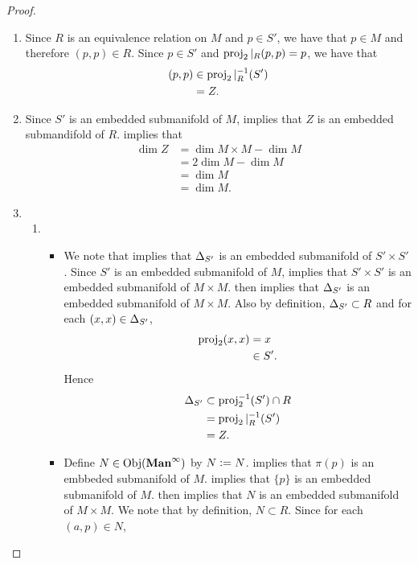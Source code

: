 \documentclass{book}
\begin{document}
	\begin{proof}\
		\begin{enumerate}
			\item Since $R$ is an equivalence relation on $M$ and $p \in S'$, we have that $p \in M$ and therefore $(p,p) \in R$. Since $p \in S'$ and $\operatorname{\text{proj}}_2|_R(p,p) = p$, we have that
			\begin{align*}
				(p,p) 
				& \in \operatorname{\text{proj}}_2|_R^{-1}(S') \\
				& = Z.
			\end{align*}
			\item {} Since $S'$ is an embedded submanifold of $M$,  implies that $Z$ is an embedded submandifold of $R$. \rex{}  implies that
			\begin{align*}
				\dim Z 
				& = \dim M \times M - \dim M \\
				& = 2 \dim M - \dim M \\
				& = \dim M \\
				& = \dim M.
			\end{align*}
			\item 
			\begin{enumerate}
				\item 
				\begin{itemize}
					\item We note that  implies that $\Delta_{S'}$ is an embedded submanifold of $S' \times S'$. Since $S'$ is an embedded submanifold of $M$,  implies that $S' \times S'$ is an embedded submanifold of $M \times M$.  then implies that $\Delta_{S'}$ is an embedded submanifold of $M \times M$. 
					Also by definition, $\Delta_{S'} \subset R$ and for each $(x, x) \in \Delta_{S'}$, 
					\begin{align*}
						\operatorname{\text{proj}}_2(x, x) 
						& = x \\
						& \in S'.
					\end{align*}
					Hence 
					\begin{align*}
						\Delta_{S'} 
						& \subset \operatorname{\text{proj}}_2^{-1}(S') \cap R \\
						& = \operatorname{\text{proj}}_2|_R^{-1}(S') \\
						& = Z.
					\end{align*}
					\item Define $N \in \operatorname{Obj}(\operatorname*{\text{\textbf{Man}}^{\infty}})$ by $N \vcentcolon= N$.  implies that $\pi(p)$ is an embbeded submanifold of $M$.   implies that $\{p\}$ is an embedded submanifold of $M$.  then implies that $N$ is an embedded submanifold of $M \times M$. We note that by definition, $N \subset R$. Since for each $(a,p) \in N$, 

\end{itemize}
\end{enumerate}
\end{enumerate}
\end{proof}
\end{document}
